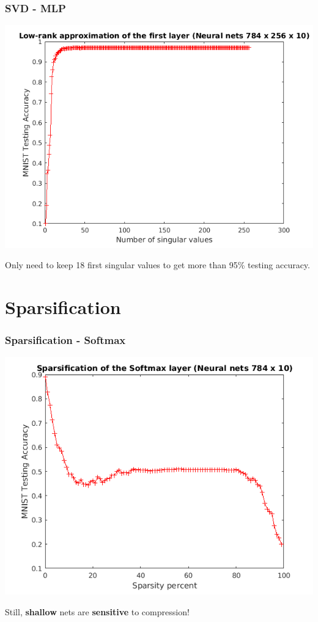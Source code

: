 \documentclass[7pt]{beamer}
\begin{document}
\begin{sloppypar}
\begin{frame}
\frametitle{SVD - MLP}
\begin{justify}
\begin{center}
	\includegraphics[scale=0.5]{Low-rank-first-layer-Neural-nets}
\end{center}
Only need to keep 18 first singular values to get more than 95\% testing accuracy.
\end{justify}
\end{frame}


\section{Sparsification}


\begin{frame}
\frametitle{Sparsification - Softmax}
\begin{justify}
\begin{center}
	\includegraphics[scale=0.4]{Sparse-Softmax}
\end{center}
Still, \textbf{shallow} nets are \textbf{sensitive} to compression!
\end{justify}
\end{frame}



\end{sloppypar}
\end{document}
